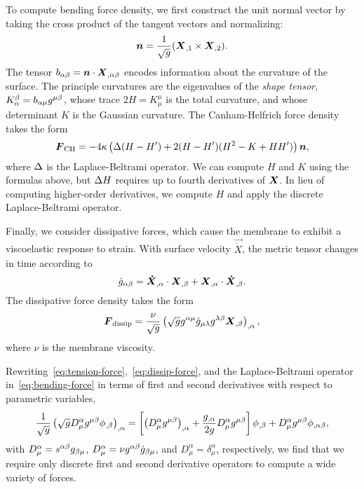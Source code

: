To compute bending force density, we first construct the unit normal vector by taking the
cross product of the tangent vectors and normalizing:
\begin{equation}\label{eq:unit-normal}
    \boldsymbol{n} = \frac{1}{\sqrt{g}} (\boldsymbol{X}_{,1}\times\boldsymbol{X}_{,2}).
\end{equation}
The tensor $b_{\alpha\beta} = \boldsymbol{n}\cdot\boldsymbol{X}_{,\alpha\beta}$ encodes information about the
curvature of the surface. The principle curvatures are the eigenvalues of the
\emph{shape tensor}, $K_\alpha^\beta = b_{\alpha\mu}g^{\mu\beta}$, whose trace
$2H = K_\mu^\mu$ is the total curvature, and whose determinant $K$ is the Gaussian
curvature. The Canham-Helfrich force density takes the form~\cite{Zhongcan:1989ue}%
\begin{equation}\label{eq:bending-force}
    \boldsymbol{F}_\text{CH} = -4\kappa\left(\Delta(H-H')+2(H-H')(H^2-K+HH')\right)\boldsymbol{n},
\end{equation}
where $\Delta$ is the Laplace-Beltrami operator. We can compute $H$ and $K$ using the
formulas above, but $\Delta H$ requires up to fourth derivatives of $\boldsymbol{X}$. In lieu of
computing higher-order derivatives, we compute $H$ and apply the discrete
Laplace-Beltrami operator.

Finally, we consider dissipative forces, which cause the membrane to exhibit a
viscoelastic response to strain. With surface velocity $\vec{\dot{X}}$, the metric tensor
changes in time according to 
\begin{equation}
    \dot{g}_{\alpha\beta} = \boldsymbol{\dot{X}}_{,\alpha}\cdot\boldsymbol{X}_{,\beta} + \boldsymbol{X}_{,\alpha}\cdot\boldsymbol{\dot{X}}_{,\beta}.
\end{equation}
The dissipative force density takes the form~\cite{Rangamani:2012hi}
\begin{equation}\label{eq:dissip-force}
    \boldsymbol{F}_\text{dissip} = \frac{\nu}{\sqrt{g}}\left(\sqrt{g}g^{\alpha\mu}\dot{g}_{\mu\lambda}g^{\lambda\beta}\boldsymbol{X}_{,\beta}\right)_{,\alpha},
\end{equation}
where $\nu$ is the membrane viscosity.

Rewriting~\eqref{eq:tension-force},~\eqref{eq:dissip-force}, and the Laplace-Beltrami
operator in~\eqref{eq:bending-force} in terms of first and second derivatives with
respect to parametric variables,
\begin{equation}\label{eq:expanded-op}
    \frac1{\sqrt{g}}\left(\sqrt{g}D^\alpha_\mu g^{\mu\beta}\phi_{,\beta}\right)_{,\alpha}
    = \left[\left(D^\alpha_\mu g^{\mu\beta}\right)_{,\alpha} + \frac{g_{,\alpha}}{2g}D^\alpha_\mu g^{\mu\beta}\right]\phi_{,\beta}+D^\alpha_\mu g^{\mu\beta}\phi_{,\alpha\beta},
\end{equation}
with $D^\alpha_\mu = s^{\alpha\beta}g_{\beta\mu}$,
$D^\alpha_\mu = \nu g^{\alpha\beta}\dot{g}_{\beta\mu}$, and
$D^\alpha_\mu = \delta^\alpha_\mu$,
respectively, we find that we require only discrete first and second derivative operators
to compute a wide variety of forces.

